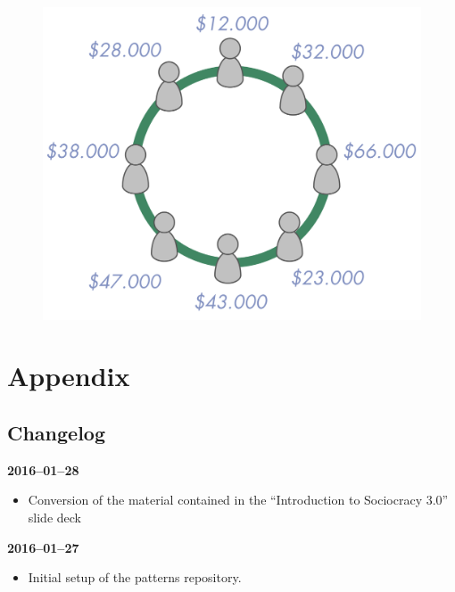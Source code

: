 \begin{figure}[htbp]
\centering
\includegraphics[keepaspectratio,width=\textwidth,height=0.75\textheight]{img/circle/transparent-salary.png}
\end{figure}

\part{Appendix}
\label{appendix}

\chapter{Changelog}
\label{changelog}

\textbf{2016--01--28}

\begin{itemize}
\item Conversion of the material contained in the ``Introduction to Sociocracy 3.0'' slide deck

\end{itemize}

\textbf{2016--01--27}

\begin{itemize}
\item Initial setup of the patterns repository.

\end{itemize}
